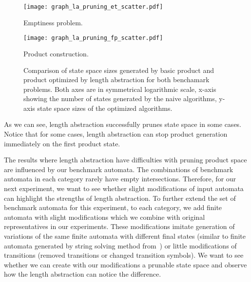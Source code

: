 \begin{figure*}[ht]
    \centering
    \begin{minipage}{0.49\linewidth}
        \centering
        \texttt{[image: graph\_la\_pruning\_et\_scatter.pdf]}
        \caption{Emptiness problem.}
        \label{fig:graph:et_pruning_state_space_sizes_comp}
    \end{minipage}
    \hfill
    \begin{minipage}{0.49\linewidth}
        \centering
        \texttt{[image: graph\_la\_pruning\_fp\_scatter.pdf]}
        \caption{Product construction.}
        \label{fig:graph:fp_pruning_state_space_sizes_comp}
    \end{minipage}
    \vspace{0.5cm}
    \caption{Comparison of state space sizes generated by basic product and product optimized by length abstraction for both benchamark problems. Both axes are in symmetrical logarithmic scale\protect\footnotemark, x-axis showing the number of states generated by the naive algorithms, y-axis state space sizes of the optimized algorithms.}
    \label{fig:graph:product_state_space_sizes}
\end{figure*}

As we can see, length abstraction successfully prunes state space in some cases. Notice that for some cases, length abstraction can stop product generation immediately on the first product state.

The results where length abstraction have difficulties with pruning product space are influenced by our benchmark automata. The combinations of benchmark automata in each category rarely have empty intersections. Therefore, for our next experiment, we want to see whether slight modifications of input automata can highlight the strengths of length abstraction. To further extend the set of benchmark automata for this experiment, to each category, we add finite automata with slight modifications which we combine with original representatives in our experiments. These modifications imitate generation of variations of the same finite automata with different final states (similar to finite automata generated by string solving method from~\cite{10.1007/978-3-319-08867-9_10}) or little modifications of transitions (removed transitions or changed transition symbols). We want to see whether we can create with our modifications a prunable state space and observe how the length abstraction can notice the difference.

